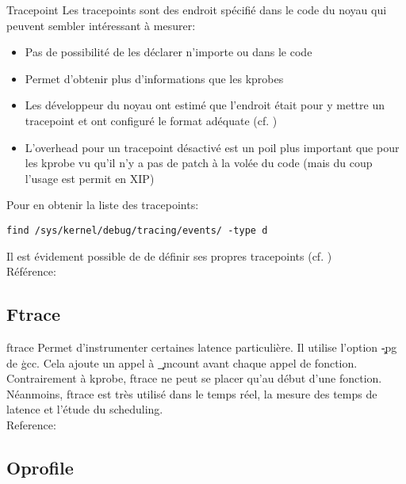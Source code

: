 \begin{frame}[fragile=singleslide]{Tracepoint}
  Les tracepoints sont  des endroit spécifié dans le  code du noyau qui
  peuvent sembler intéressant à mesurer:
  \begin{itemize}  
  \item Pas de possibilité de les déclarer n'importe ou dans le code
  \item Permet d'obtenir plus d'informations que les kprobes
  \item Les développeur du noyau  ont estimé que l'endroit était pour y mettre un tracepoint et ont configuré le format adéquate (cf.
    )
  \item  L'overhead pour  un  tracepoint désactivé  est  un poil  plus
    important que  pour les kprobe  vu qu'il n'y  a pas de patch  à la
    volée du code (mais du coup l'usage est permit en XIP)
  \end{itemize} 
  Pour en obtenir la liste des tracepoints:
  \begin{lstlisting} 
find /sys/kernel/debug/tracing/events/ -type d
  \end{lstlisting} 
  Il  est évidement  possible  de de  définir  ses propres  tracepoints
  (cf. )
  \\[2ex]
  Référence: 
\end{frame} 

\subsection{Ftrace}

\begin{frame}[fragile=singleslide]{ftrace}
  Permet  d'instrumenter certaines  latence  particulière. Il  utilise
  l'option  \c{-pg} de  \c{gcc}. Cela  ajoute un  appel  à \c{_mcount}
  avant chaque  appel de fonction.  Contrairement à  kprobe, ftrace ne
  peut se placer qu'au début d'une fonction.
  \\[2ex]
  Néanmoins, ftrace est très utilisé dans le temps réel, la mesure des
  temps de latence et l'étude du scheduling.
  \\[2ex]
  Reference:                      
\end{frame} 

\subsection{Oprofile}

